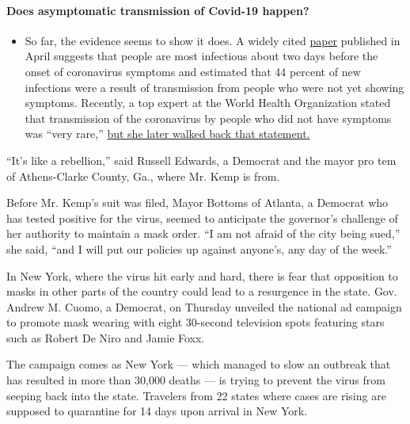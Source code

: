 \begin{itemize}
{  \paragraph{Does asymptomatic transmission of Covid-19
  happen?}\label{does-asymptomatic-transmission-of-covid-19-happen}}

  \begin{itemize}
  \tightlist
  \item
    So far, the evidence seems to show it does. A widely cited
    \href{https://www.nature.com/articles/s41591-020-0869-5}{paper}
    published in April suggests that people are most infectious about
    two days before the onset of coronavirus symptoms and estimated that
    44 percent of new infections were a result of transmission from
    people who were not yet showing symptoms. Recently, a top expert at
    the World Health Organization stated that transmission of the
    coronavirus by people who did not have symptoms was ``very rare,''
    \href{https://www.nytimes.com/2020/06/09/world/coronavirus-updates.html?action=click\&pgtype=Article\&state=default\&region=MAIN_CONTENT_3\&context=storylines_faq\#link-1f302e21}{but
    she later walked back that statement.}
  \end{itemize}
\end{itemize}

``It's like a rebellion,'' said Russell Edwards, a Democrat and the
mayor pro tem of Athens-Clarke County, Ga., where Mr. Kemp is from.

Before Mr. Kemp's suit was filed, Mayor Bottoms of Atlanta, a Democrat
who has tested positive for the virus, seemed to anticipate the
governor's challenge of her authority to maintain a mask order. ``I am
not afraid of the city being sued,'' she said, ``and I will put our
policies up against anyone's, any day of the week.''

In New York, where the virus hit early and hard, there is fear that
opposition to masks in other parts of the country could lead to a
resurgence in the state. Gov. Andrew M. Cuomo, a Democrat, on Thursday
unveiled the national ad campaign to promote mask wearing with eight
30-second television spots featuring stars such as Robert De Niro and
Jamie Foxx.

The campaign comes as New York --- which managed to slow an outbreak
that has resulted in more than 30,000 deaths --- is trying to prevent
the virus from seeping back into the state. Travelers from 22 states
where cases are rising are supposed to quarantine for 14 days upon
arrival in New York.

